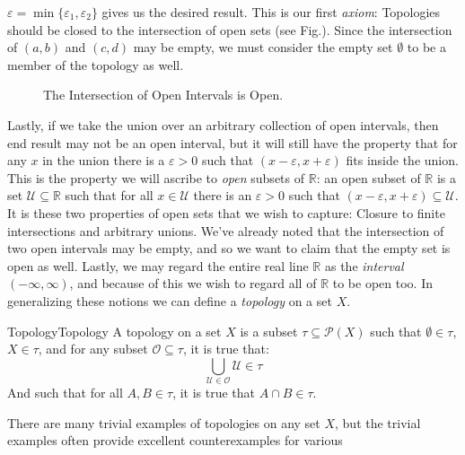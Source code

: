     $\varepsilon=\min\{\varepsilon_{1},\varepsilon_{2}\}$ gives us the desired
    result. This is our first \textit{axiom}: Topologies should be closed to
    the intersection of open sets (see Fig.). Since the intersection of
    $(a,b)$ and $(c,d)$ may be empty, we must consider the empty set $\emptyset$
    to be a member of the topology as well.
    \begin{figure}[H]
        \centering
        \captionsetup{type=figure}
        
        \caption{The Intersection of Open Intervals is Open.}
        \label{fig:Closed_Interval_is_Not_Open}
    \end{figure}
    Lastly,
    if we take the union over an arbitrary collection of open intervals, then
    end result may not be an open interval, but it will still have the property
    that for any $x$ in the union there is a $\varepsilon>0$ such that
    $(x-\varepsilon,x+\varepsilon)$ fits inside the union. This is the property
    we will ascribe to \textit{open} subsets of $\mathbb{R}$:
    an open subset of $\mathbb{R}$ is a set $\mathcal{U}\subseteq\mathbb{R}$
    such that for all $x\in\mathcal{U}$ there is an $\varepsilon>0$ such that
    $(x-\varepsilon,x+\varepsilon)\subseteq\mathcal{U}$. It is these two
    properties of open sets that we wish to capture: Closure to finite
    intersections and arbitrary unions. We've already noted that the
    intersection of two open intervals may be empty, and so we want to claim
    that the empty set is open as well. Lastly, we may regard the entire real
    line $\mathbb{R}$ as the \textit{interval} $(\minus\infty,\infty)$, and
    because of this we wish to regard all of $\mathbb{R}$ to be open too. In
    generalizing these notions we can define a \textit{topology} on a set $X$.
    \begin{fdefinition}{Topology}{Topology}
        A \gls{topology} on a \gls{set} $X$ is a \gls{subset}
        $\tau\subseteq\mathcal{P}(X)$ such that $\emptyset\in\tau$, $X\in\tau$,
        and for any subset $\mathcal{O}\subseteq\tau$, it is true that:
        \begin{equation*}
            \bigcup_{\mathcal{U}\in\mathcal{O}}\mathcal{U}\in\tau
        \end{equation*}
        And such that for all $A,B\in\tau$, it is true that $A\cap{B}\in\tau$.
    \end{fdefinition}
    There are many trivial examples of topologies on any set $X$, but the
    trivial examples often provide excellent counterexamples for various
